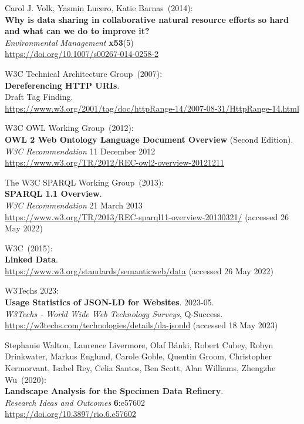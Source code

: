 \begin{thebibliography}{9}
Carol J. Volk, Yasmin Lucero, Katie Barnas~(2014): \\
\textbf{Why is data sharing in collaborative natural resource efforts so
hard and what can we do to improve it?}\\
\emph{Environmental Management} \textbf{x53}(5) \\
\url{https://doi.org/10.1007/s00267-014-0258-2}

W3C Technical Architecture Group~(2007): \\
\textbf{Dereferencing HTTP URIs}.\\
Draft Tag Finding.\\
\url{https://www.w3.org/2001/tag/doc/httpRange-14/2007-08-31/HttpRange-14.html}

W3C OWL Working Group~(2012): \\
\textbf{{OWL} 2 {Web Ontology Language Document Overview}} ({Second Edition}). \\
\emph{W3C Recommendation} 11 December 2012 \\
\url{https://www.w3.org/TR/2012/REC-owl2-overview-20121211} 

The W3C SPARQL Working Group~(2013): \\
\textbf{{SPARQL} 1.1 {Overview}}. \\
\emph{W3C Recommendation} 21 March 2013 \\
\url{https://www.w3.org/TR/2013/REC-sparql11-overview-20130321/} (accessed 26 May 2022)

W3C~(2015): \\
\textbf{Linked Data}.\\
\url{https://www.w3.org/standards/semanticweb/data} (accessed 26 May 2022)

W3Techs 2023: \\
\textbf{Usage Statistics of JSON-LD for Websites}. 2023-05. \\
\emph{W3Techs - World Wide Web Technology Surveys}, Q-Success.\\
\url{https://w3techs.com/technologies/details/da-jsonld} (accessed 18
May 2023)

Stephanie Walton, Laurence Livermore, Olaf Bánki,
Robert Cubey, Robyn Drinkwater, Markus Englund, Carole Goble, Quentin
Groom, Christopher Kermorvant, Isabel Rey, Celia Santos, Ben Scott, Alan
Williams, Zhengzhe Wu~(2020): \\
\textbf{Landscape Analysis for the Specimen Data Refinery}.\\
\emph{Research Ideas and Outcomes} \textbf{6}:e57602\\
\url{https://doi.org/10.3897/rio.6.e57602}


\end{thebibliography}
